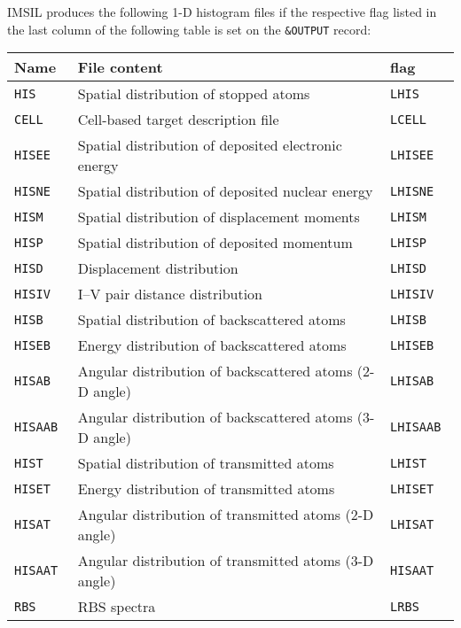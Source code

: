 IMSIL produces the following 1-D histogram files if the respective flag listed
in the last column of the following table is set on the \texttt{\&OUTPUT} record:
\bigskip
%
\begin{center}
\begin{tabular}{|l|p{}|l|}
\hline
Name       & File content                                           & flag \\
\hline
\tt HIS    & Spatial distribution of stopped atoms                  & \tt LHIS \\
\tt CELL   & Cell-based target description file                     & \tt LCELL \\
\tt HISEE  & Spatial distribution of deposited electronic energy    & \tt LHISEE \\
\tt HISNE  & Spatial distribution of deposited nuclear energy       & \tt LHISNE \\
\tt HISM   & Spatial distribution of displacement moments           & \tt LHISM \\
\tt HISP   & Spatial distribution of deposited momentum             & \tt LHISP \\
\tt HISD   & Displacement distribution                              & \tt LHISD \\
\tt HISIV  & I--V pair distance distribution                        & \tt LHISIV \\
\tt HISB   & Spatial distribution of backscattered atoms            & \tt LHISB \\
\tt HISEB  & Energy distribution of backscattered atoms             & \tt LHISEB \\
\tt HISAB  & Angular distribution of backscattered atoms (2-D angle)& \tt LHISAB \\
\tt HISAAB & Angular distribution of backscattered atoms (3-D angle)& \tt LHISAAB \\
\tt HIST   & Spatial distribution of transmitted atoms              & \tt LHIST \\
\tt HISET  & Energy distribution of transmitted atoms               & \tt LHISET \\
\tt HISAT  & Angular distribution of transmitted atoms (2-D angle)  & \tt LHISAT \\
\tt HISAAT & Angular distribution of transmitted atoms (3-D angle)  & \tt HISAAT \\
\tt RBS    & RBS spectra                                            & \tt LRBS \\
\hline
\end{tabular}
\end{center}


